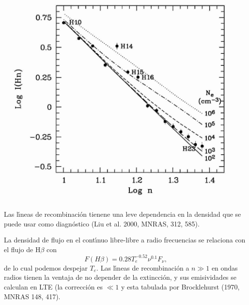 




\begin{floatingfigure}{14cm}
\includegraphics[width=13cm,height=!]{Hn_Ne.jpg}
\end{floatingfigure}  Las l\'{\i}neas de recombinaci\'on tienene una
leve dependencia en la densidad que se puede usar como diagn\'ostico
(Liu et al. 2000, MNRAS, 312, 585). 


La densidad de flujo en el cont\'{\i}nuo libre-libre a radio
frecuencias se relaciona con el flujo de H$\beta$ con
\[
F(H\beta) = 0.28 T_e^{-0.52} \nu^{0.1} F_\nu,
\]
de lo cual podemos despejar $T_e$. Las l\'{\i}neas de recombinaci\'on
a $n\gg 1$ en ondas radios tienen la ventaja de no depender de la
extincci\'on, y sus emisividades se calculan en LTE (la correcci\'on
es $\ll 1$ y esta tabulada por Brocklehurst (1970, MNRAS 148, 417).



